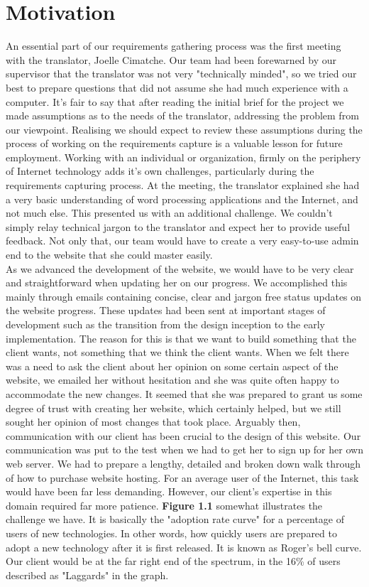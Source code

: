 \documentclass{l3proj}
\begin{document}
\section{Motivation}
An essential part of our requirements gathering process was the first meeting
with the translator, Joelle Cimatche. Our team had been forewarned by our
supervisor that the translator was not very "technically minded", so we tried
our best to prepare questions that did not assume she had much experience with a
computer. It's fair to say that after reading the initial brief for the project
we made assumptions as to the needs of the translator, addressing the problem
from our viewpoint. Realising we should expect to review these assumptions
during the process of working on the requirements capture is a valuable lesson
for future employment. Working with an individual or organization, firmly on the
periphery of Internet technology adds it's own challenges, particularly during
the requirements capturing process. At the meeting, the translator explained she
had a very basic understanding of word processing applications and the Internet,
and not much else. This presented us with an additional challenge. We couldn't
simply relay technical jargon to the translator and expect her to provide useful
feedback. Not only that, our team would have to create a very easy-to-use admin
end to the website that she could master easily.\\
As we advanced the development of the website, we would have to be very clear
and straightforward when updating her on our progress. We accomplished this
mainly through emails containing concise, clear and jargon free status updates
on the website progress. These updates had been sent at important stages of
development such as the transition from the design inception to the early
implementation. The reason for this is that we want to build something that the
client wants, not something that we think the client wants. When we felt there
was a need to ask the client about her opinion on some certain aspect of the
website, we emailed her without hesitation and she was quite often happy to
accommodate the new changes. It seemed that she was prepared to grant us some
degree of trust with creating her website, which certainly helped, but we still
sought her opinion of most changes that took place. Arguably then, communication
with our client has been crucial to the design of this website. Our
communication was put to the test when we had to get her to sign up for her own
web server. We had to prepare a lengthy, detailed and broken down walk through
of how to purchase website hosting. For an average user of the Internet, this
task would have been far less demanding. However, our client's expertise in this
domain required far more patience. \textbf{Figure 1.1} somewhat illustrates the
challenge we have. It is basically the "adoption rate curve" for a percentage of
users of new technologies. In other words, how quickly users are prepared to
adopt a new technology after it is first released. It is known as Roger's bell
curve. Our client would be at the far right end of the spectrum, in the 16\% of
users described as "Laggards" in the graph.\\
	
\end{document}
